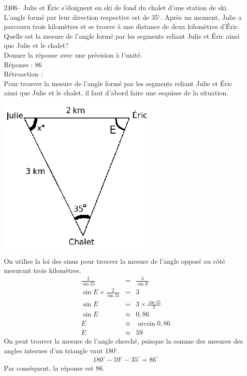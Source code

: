 \documentclass[letterpaper, 12pt]{article}
\begin{document}
2406-- Julie et \'Eric s'\'eloignent en ski de fond du chalet d'une station de ski. L'angle form\'e par leur direction respective est de 35$^{\circ}$. Apr\`es un moment, Julie a parcouru trois kilom\`etres et se trouve \`a une distance de deux kilom\`etres d'\'Eric. Quelle est la mesure de l'angle form\'e par les segments reliant Julie et \'Eric ainsi que Julie et le chalet? \\
Donner la r\'eponse avec une pr\'ecision \`a l'unit\'e.\\

R\'eponse : 86\\

R\'etroaction :\\
Pour trouver la mesure de l'angle form\'e par les segments reliant Julie et \'Eric ainsi que Julie et le chalet, il faut d'abord faire une esquisse de la situation.
\begin{center}
 \includegraphics[width=8cm,bb=14 14 232 185]{Q2406.eps}
\end{center}
On utilise la loi des sinus pour trouver la mesure de l'angle oppos\'e au c\^ot\'e mesurant trois kilom\`etres.
\begin{eqnarray*}
 \frac{2}{\sin{35}}&=&\frac{3}{\sin{E}}\\[2mm]
 \sin{E}\times \frac{2}{\sin{35}}&=&3\\[2mm]
 \sin{E}&=&3\times \frac{\sin{35}}{2}\\[2mm]
 \sin{E}&\approx&0,86\\
 E&\approx&\arcsin{0,86}\\
 E&\approx&59
\end{eqnarray*}
On peut trouver la mesure de l'angle cherch\'e, puisque la somme des mesures des angles internes d'un triangle vaut 180$^{\circ}$.
\begin{eqnarray*}
 180^{\circ}-59^{\circ}-35^{\circ}=86^{\circ}
\end{eqnarray*}
Par cons\'equent, la r\'eponse est 86.\\
\end{document}
